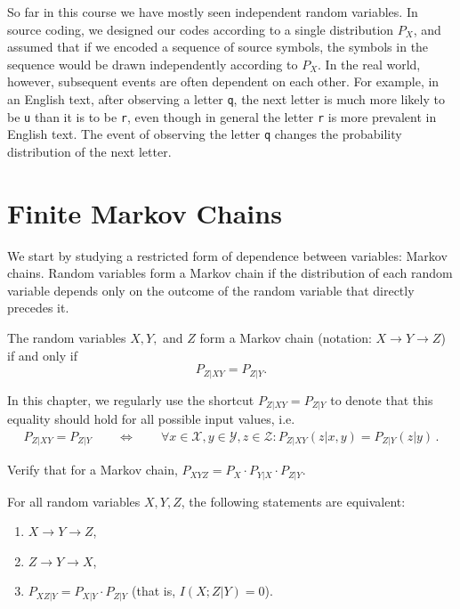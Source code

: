 So far in this course we have mostly seen independent random variables. In source coding, we designed our codes according to a single distribution $P_X$, and assumed that if we encoded a sequence of source symbols, the symbols in the sequence would be drawn independently according to $P_X$. In the real world, however, subsequent events are often dependent on each other. For example, in an English text, after observing a letter \texttt{q}, the next letter is much more likely to be \texttt{u} than it is to be \texttt{r}, even though in general the letter \texttt{r} is more prevalent in English text. The event of observing the letter \texttt{q} changes the probability distribution of the next letter.

\section{Finite Markov Chains}\label{sec:three-var-MC}
We start by studying a restricted form of dependence between variables: Markov chains. Random variables form a Markov chain if the distribution of each random variable depends only on the outcome of the random variable that directly precedes it.

\begin{definition}\label{def:Markov-chain}
The random variables $X, Y,$ and $Z$ form a Markov chain (notation: $X \to Y \to Z$) if and only if
\[
P_{Z|XY} = P_{Z|Y}.
\]
\end{definition}
In this chapter, we regularly use the shortcut $P_{Z|XY} = P_{Z|Y}$ to denote that this equality should hold for all possible input values, i.e.
\begin{align}
P_{Z|XY} = P_{Z|Y} \qquad \Leftrightarrow \qquad \forall x \in \mathcal{X}, y \in \mathcal{Y}, z \in \mathcal{Z}: P_{Z|XY}(z|x,y) = P_{Z|Y}(z|y) \, .
\end{align}

\begin{exercise}
Verify that for a Markov chain, $P_{XYZ} = P_X \cdot P_{Y|X} \cdot P_{Z|Y}$.
\end{exercise}

\begin{proposition}\label{prop:markov-chains}
For all random variables $X,Y,Z$, the following statements are equivalent:
\begin{enumerate}[label=\alph*.]
\item $X \to Y \to Z$,
\item $Z \to Y \to X$,
\item $P_{XZ|Y} = P_{X|Y} \cdot P_{Z|Y}$ (that is, $I(X;Z|Y) = 0$).
\end{enumerate}
\end{proposition}

